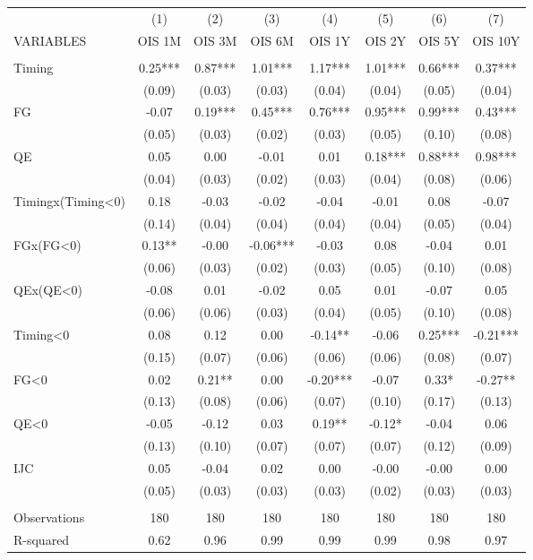 \begin{tabular}{lccccccc} \hline
 & (1) & (2) & (3) & (4) & (5) & (6) & (7) \\
VARIABLES & OIS 1M & OIS 3M & OIS 6M & OIS 1Y & OIS 2Y & OIS 5Y & OIS 10Y \\ \hline
 &  &  &  &  &  &  &  \\
Timing & 0.25*** & 0.87*** & 1.01*** & 1.17*** & 1.01*** & 0.66*** & 0.37*** \\
 & (0.09) & (0.03) & (0.03) & (0.04) & (0.04) & (0.05) & (0.04) \\
FG & -0.07 & 0.19*** & 0.45*** & 0.76*** & 0.95*** & 0.99*** & 0.43*** \\
 & (0.05) & (0.03) & (0.02) & (0.03) & (0.05) & (0.10) & (0.08) \\
QE & 0.05 & 0.00 & -0.01 & 0.01 & 0.18*** & 0.88*** & 0.98*** \\
 & (0.04) & (0.03) & (0.02) & (0.03) & (0.04) & (0.08) & (0.06) \\
Timingx(Timing<0) & 0.18 & -0.03 & -0.02 & -0.04 & -0.01 & 0.08 & -0.07 \\
 & (0.14) & (0.04) & (0.04) & (0.04) & (0.04) & (0.05) & (0.04) \\
FGx(FG<0) & 0.13** & -0.00 & -0.06*** & -0.03 & 0.08 & -0.04 & 0.01 \\
 & (0.06) & (0.03) & (0.02) & (0.03) & (0.05) & (0.10) & (0.08) \\
QEx(QE<0) & -0.08 & 0.01 & -0.02 & 0.05 & 0.01 & -0.07 & 0.05 \\
 & (0.06) & (0.06) & (0.03) & (0.04) & (0.05) & (0.10) & (0.08) \\
Timing<0 & 0.08 & 0.12 & 0.00 & -0.14** & -0.06 & 0.25*** & -0.21*** \\
 & (0.15) & (0.07) & (0.06) & (0.06) & (0.06) & (0.08) & (0.07) \\
FG<0 & 0.02 & 0.21** & 0.00 & -0.20*** & -0.07 & 0.33* & -0.27** \\
 & (0.13) & (0.08) & (0.06) & (0.07) & (0.10) & (0.17) & (0.13) \\
QE<0 & -0.05 & -0.12 & 0.03 & 0.19** & -0.12* & -0.04 & 0.06 \\
 & (0.13) & (0.10) & (0.07) & (0.07) & (0.07) & (0.12) & (0.09) \\
IJC & 0.05 & -0.04 & 0.02 & 0.00 & -0.00 & -0.00 & 0.00 \\
 & (0.05) & (0.03) & (0.03) & (0.03) & (0.02) & (0.03) & (0.03) \\
 &  &  &  &  &  &  &  \\
Observations & 180 & 180 & 180 & 180 & 180 & 180 & 180 \\
 R-squared & 0.62 & 0.96 & 0.99 & 0.99 & 0.99 & 0.98 & 0.97 \\ \hline
\end{tabular}
